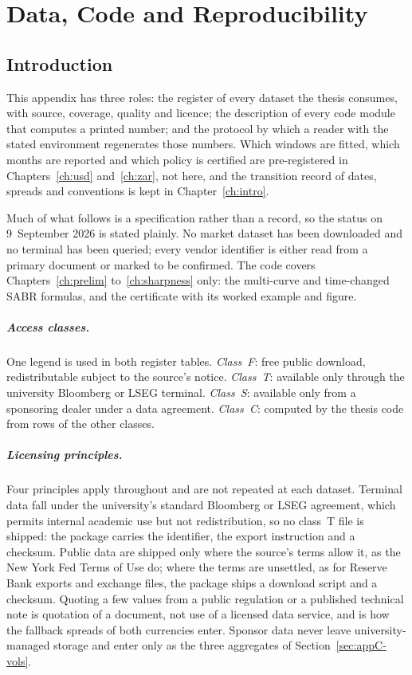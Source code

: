 \documentclass[../../main.tex]{subfiles}
\begin{document}
\chapter{Data, Code and Reproducibility}\label{appC-data-code}\label{app:data}

\section{Introduction}\label{sec:appC-intro}

This appendix has three roles: the register of every dataset the thesis consumes, with source, coverage, quality and licence; the description of every code module that computes a printed number; and the protocol by which a reader with the stated environment regenerates those numbers. Which windows are fitted, which months are reported and which policy is certified are pre-registered in Chapters~\ref{ch:usd} and~\ref{ch:zar}, not here, and the transition record of dates, spreads and conventions is kept in Chapter~\ref{ch:intro}.

Much of what follows is a specification rather than a record, so the status on 9~September 2026 is stated plainly. No market dataset has been downloaded and no terminal has been queried; every vendor identifier is either read from a primary document or marked to be confirmed. The code covers Chapters~\ref{ch:prelim} to~\ref{ch:sharpness} only: the multi-curve and time-changed SABR formulas, and the certificate with its worked example and figure.

\paragraph{Access classes.} One legend is used in both register tables. \emph{Class~F}: free public download, redistributable subject to the source's notice. \emph{Class~T}: available only through the university Bloomberg or LSEG terminal. \emph{Class~S}: available only from a sponsoring dealer under a data agreement. \emph{Class~C}: computed by the thesis code from rows of the other classes.

\paragraph{Licensing principles.} Four principles apply throughout and are not repeated at each dataset. Terminal data fall under the university's standard Bloomberg or LSEG agreement, which permits internal academic use but not redistribution, so no class~T file is shipped: the package carries the identifier, the export instruction and a checksum. Public data are shipped only where the source's terms allow it, as the New York Fed Terms of Use do; where the terms are unsettled, as for Reserve Bank exports and exchange files, the package ships a download script and a checksum. Quoting a few values from a public regulation or a published technical note is quotation of a document, not use of a licensed data service, and is how the fallback spreads of both currencies enter. Sponsor data never leave university-managed storage and enter only as the three aggregates of Section~\ref{sec:appC-vols}.
\end{document}
